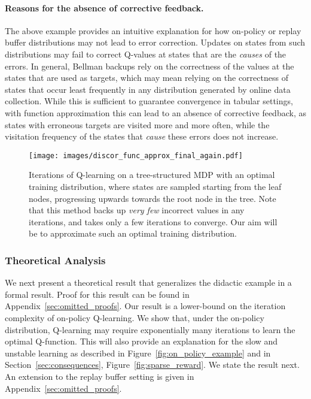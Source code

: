 \documentclass[jmlr]{article}
\begin{document}
\paragraph{Reasons for the absence of corrective feedback.} The above example provides an intuitive explanation for how on-policy or replay buffer distributions may not lead to error correction. Updates on states from such distributions may fail to correct Q-values at states that are the \textit{causes} of the errors. In general, Bellman backups rely on the correctness of the values at the states that are used as targets, which may mean relying on the correctness of states that occur least frequently in any distribution generated by online data collection. While this is sufficient to guarantee convergence in tabular settings, with function approximation this can lead to an absence of corrective feedback, as states with erroneous targets are visited more and more often, while the visitation frequency of the states that \emph{cause} these errors does not increase. 





\begin{figure*}
\centering
\texttt{[image: images/discor\_func\_approx\_final\_again.pdf]}
    \caption{\footnotesize{Iterations of Q-learning on a tree-structured MDP with an optimal training distribution, where states are sampled starting from the leaf nodes, progressing upwards towards the root node in the tree. Note that this method backs up \textit{very few} incorrect values in any iterations, and takes only a few iterations to converge. Our aim will be to approximate such an optimal training distribution.}}
  \vspace{-10pt}
  \label{fig:discor_sample}
\end{figure*}

\subsubsection{Theoretical Analysis} 
\label{sec:theoretical_analysis}
We next present a theoretical result that generalizes the didactic example in a formal result. Proof for this result can be found in Appendix~\ref{sec:omitted_proofs}. 
Our result is a lower-bound on the iteration 
complexity of on-policy Q-learning. We show that, under the on-policy distribution, Q-learning may require exponentially many iterations to learn the optimal Q-function. This will also provide an explanation for the slow and unstable learning as described in Figure~\ref{fig:on_policy_example} and in Section~\ref{sec:consequences}, Figure~\ref{fig:sparse_reward}. We state the result next. An extension to the replay buffer setting is given in Appendix~\ref{sec:omitted_proofs}.
\end{document}
